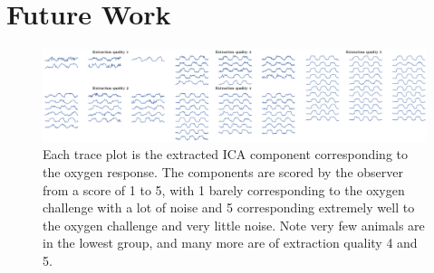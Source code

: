 
\chapter{Future Work}
\label{ch:futurework}

\begin{figure}[htbp]
   \centering
   \includegraphics[width=\textwidth]{futurework/futurework-images/technical_ScoredExtractions.png} %
   \caption{Each trace plot is the extracted ICA component corresponding to the oxygen response. The components are scored by the observer from a score of 1 to 5, with 1 barely corresponding to the oxygen challenge with a lot of noise and 5 corresponding extremely well to the oxygen challenge and very little noise. Note very few animals are in the lowest group, and many more are of extraction quality 4 and 5.}
   \label{extractions}
\end{figure}

\endinput